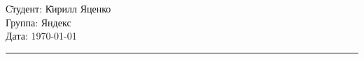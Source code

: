 \begin{tabbing}
\hspace{11cm} \= Студент: \= Кирилл Яценко \\
  \> Группа: Яндекс \>  \\
  \> Дата: \> \today
\end{tabbing}
\hrule
\vspace{1cm}

